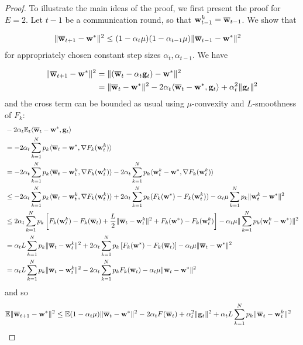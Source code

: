 \begin{proof}
	To illustrate the main ideas of the proof, we first present the proof
	for $E=2$. Let $t-1$ be a communication round, so that ${\mathbf{w}}_{t-1}^{k}={\overline{\mathbf{w}}}_{t-1}$.
	We show that 
	
	\begin{align*}
	\|{\overline{\mathbf{w}}}_{t+1}-{\mathbf{w}}^{\ast}\|^{2} & \leq(1-\alpha_{t}\mu)(1-\alpha_{t-1}\mu)\|{\overline{\mathbf{w}}}_{t-1}-{\mathbf{w}}^{\ast}\|^{2}
	\end{align*}
	for appropriately chosen constant step sizes $\alpha_{t},\alpha_{t-1}$.
	We have 
	
	\begin{align*}
	\|{\overline{\mathbf{w}}}_{t+1}-{\mathbf{w}}^{\ast}\|^{2} & =\|({\overline{\mathbf{w}}}_{t}-\alpha_{t}{\mathbf{g}}_{t})-{\mathbf{w}}^{\ast}\|^{2}\\
	& =\|{\overline{\mathbf{w}}}_{t}-{\mathbf{w}}^{\ast}\|^{2}-2\alpha_{t}\langle{\overline{\mathbf{w}}}_{t}-{\mathbf{w}}^{\ast},{\mathbf{g}}_{t}\rangle+\alpha_{t}^{2}\|{\mathbf{g}}_{t}\|^{2}
	\end{align*}
	and the cross term can be bounded as usual using $\mu$-convexity
	and $L$-smoothness of $F_{k}$:
	\begin{align*}
	&-2\alpha_{t}\mathbb{E}_{t}\langle{\overline{\mathbf{w}}}_{t}-{\mathbf{w}}^{\ast},{\mathbf{g}}_{t}\rangle\\
	& =-2\alpha_{t}\sum_{k=1}^{N}p_{k}\langle{\overline{\mathbf{w}}}_{t}-{\mathbf{w}}^{\ast},\nabla F_{k}({\mathbf{w}}_{t}^{k})\rangle\\
	& =-2\alpha_{t}\sum_{k=1}^{N}p_{k}\langle{\overline{\mathbf{w}}}_{t}-{\mathbf{w}}_{t}^{k},\nabla F_{k}({\mathbf{w}}_{t}^{k})\rangle-2\alpha_{t}\sum_{k=1}^{N}p_{k}\langle {\mathbf{w}}_{t}^{k}-{\mathbf{w}}^{\ast},\nabla F_{k}({\mathbf{w}}_{t}^{k})\rangle\\
	& \leq-2\alpha_{t}\sum_{k=1}^{N}p_{k}\langle{\overline{\mathbf{w}}}_{t}-{\mathbf{w}}_{t}^{k},\nabla F_{k}({\mathbf{w}}_{t}^{k})\rangle+2\alpha_{t}\sum_{k=1}^{N}p_{k}(F_{k}({\mathbf{w}}^{\ast})-F_{k}({\mathbf{w}}_{t}^{k}))-\alpha_{t}\mu\sum_{k=1}^{N}p_{k}\|{\mathbf{w}}_{t}^{k}-{\mathbf{w}}^{\ast}\|^{2}\\
	& \leq2\alpha_{t}\sum_{k=1}^{N}p_{k}\left[F_{k}({\mathbf{w}}_{t}^{k})-F_{k}({\overline{\mathbf{w}}}_{t})+\frac{L}{2}\|{\overline{\mathbf{w}}}_{t}-{\mathbf{w}}_{t}^{k}\|^{2}+F_{k}({\mathbf{w}}^{\ast})-F_{k}({\mathbf{w}}_{t}^{k})\right]-\alpha_{t}\mu\|\sum_{k=1}^{N}p_{k}({\mathbf{w}}_{t}^{k}-{\mathbf{w}}^{\ast})\|^{2}\\
	& =\alpha_{t}L\sum_{k=1}^{N}p_{k}\|{\overline{\mathbf{w}}}_{t}-{\mathbf{w}}_{t}^{k}\|^{2}+2\alpha_{t}\sum_{k=1}^{N}p_{k}\left[F_{k}({\mathbf{w}}^{\ast})-F_{k}({\overline{\mathbf{w}}}_{t})\right]-\alpha_{t}\mu\|{\overline{\mathbf{w}}}_{t}-{\mathbf{w}}^{\ast}\|^{2}\\
	& =\alpha_{t}L\sum_{k=1}^{N}p_{k}\|{\overline{\mathbf{w}}}_{t}-{\mathbf{w}}_{t}^{k}\|^{2}-2\alpha_{t}\sum_{k=1}^{N}p_{k}F_{k}({\overline{\mathbf{w}}}_{t})-\alpha_{t}\mu\|{\overline{\mathbf{w}}}_{t}-{\mathbf{w}}^{\ast}\|^{2}
	\end{align*}
	and so 
	\begin{align*}
	\mathbb{E}\|{\overline{\mathbf{w}}}_{t+1}-{\mathbf{w}}^{\ast}\|^{2} & \leq\mathbb{E}(1-\alpha_{t}\mu)\|{\overline{\mathbf{w}}}_{t}-{\mathbf{w}}^{\ast}\|^{2}-2\alpha_{t}F({\overline{\mathbf{w}}}_{t})+\alpha_{t}^{2}\|{\mathbf{g}}_{t}\|^{2}+\alpha_{t}L\sum_{k=1}^{N}p_{k}\|{\overline{\mathbf{w}}}_{t}-{\mathbf{w}}_{t}^{k}\|^{2}
	\end{align*}
	

\end{proof}
